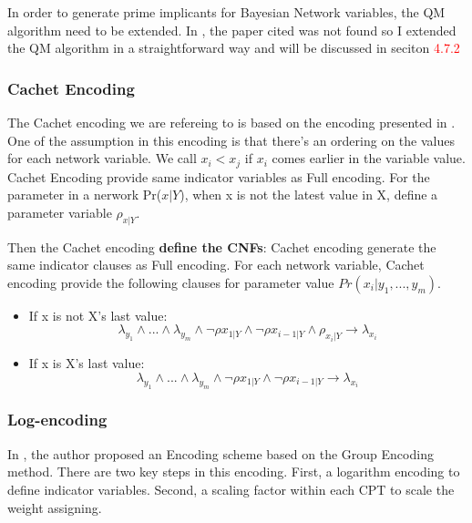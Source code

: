         In order to generate prime implicants for Bayesian Network variables, the QM algorithm need to be extended. In \cite{2006-enc3}, the paper cited was not found so I extended the QM algorithm in a straightforward way and will be discussed in seciton \textcolor{red}{4.7.2}
        
        \subsubsection{Cachet Encoding}
        The Cachet encoding we are refereing to is based on the encoding presented in \cite{Sang:2005:PBI:1619332.1619409}. One of the assumption in this encoding is that there's an ordering on the values for each network variable. We call $x_{i} < x_{j}$ if $x_{i}$ comes earlier in the variable value.\\
        
        Cachet Encoding provide same indicator variables as Full encoding. For the parameter in a nerwork Pr($x|Y$), when x is not the latest value in X, define a parameter variable $\rho_{x|Y}$.
        
        Then the Cachet encoding \textbf{define the CNFs}: Cachet encoding generate the same indicator clauses as Full encoding. For each network variable, Cachet encoding provide the following clauses for parameter value $Pr(x_{i}|y_{1}, ... , y_{m})$.
        \begin{itemize}
            \item If x is not X's last value: $$\lambda_{y_{1}} \wedge ... \wedge \lambda_{y_{m}} \wedge \neg \rho x_{1|Y} \wedge \neg \rho x_{i-1|Y} \wedge \rho_{x_{i}|Y} \rightarrow \lambda_{x_{i}}$$
            \item If x is X's last value:
            $$\lambda_{y_{1}} \wedge ... \wedge \lambda_{y_{m}} \wedge \neg \rho x_{1|Y} \wedge \neg \rho x_{i-1|Y} \rightarrow \lambda_{x_{i}}$$
        \end{itemize}
        \subsubsection{Log-encoding}
        In \cite{2016-logencoding}, the author proposed an Encoding scheme based on the Group Encoding method. There are two key steps in this encoding. First, a logarithm encoding to define indicator variables. Second, a scaling factor within each CPT to scale the weight assigning.\\
        
